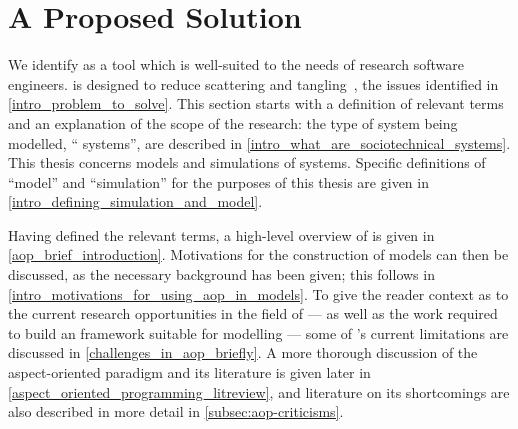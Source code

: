 \section{A Proposed Solution}
\label{intro_proposed_solution}
We identify \aop{} as a tool which is well-suited to the needs of research
software engineers. \Aop is designed to reduce scattering and
tangling~\cite{kiczales1997aspect}, the issues identified in
\cref{intro_problem_to_solve}. This section starts with a definition of relevant
terms and an explanation of the scope of the research: the type of system being
modelled, ``\sociotechnical{} systems'', are described in
\cref{intro_what_are_sociotechnical_systems}. This thesis concerns models and
simulations of \sociotechnical systems. Specific definitions of ``model'' and
``simulation'' for the purposes of this thesis are given in
\cref{intro_defining_simulation_and_model}.


Having defined the relevant terms, a high-level overview of \aop{} is given in
\cref{aop_brief_introduction}. Motivations for the construction of
\aspectoriented{} models can then be discussed, as the necessary background has
been given; this follows in \cref{intro_motivations_for_using_aop_in_models}. To
give the reader context as to the current research opportunities in the field of
\aop{} --- as well as the work required to build an \aspectorientation{}
framework suitable for \aspectoriented{} modelling --- some of \aop{}'s current
limitations are discussed in \cref{challenges_in_aop_briefly}. A more thorough
discussion of the aspect-oriented paradigm and its literature is given later in
\cref{aspect_oriented_programming_litreview}, and literature on its shortcomings
are also described in more detail in \cref{subsec:aop-criticisms}.




